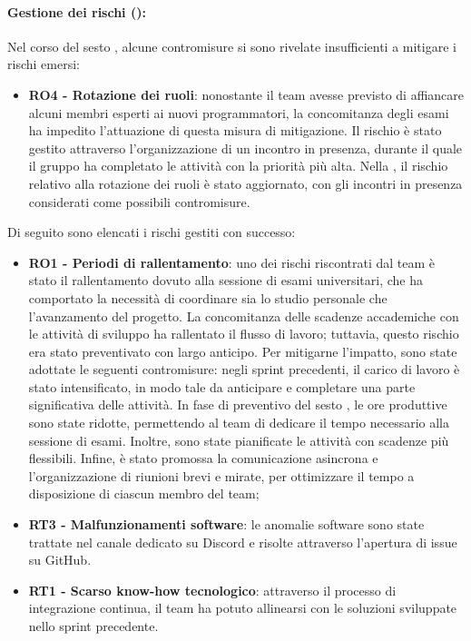 \paragraph*{Gestione dei rischi ():}
\par Nel corso del sesto , alcune contromisure si sono rivelate insufficienti a mitigare i rischi emersi:
\begin{itemize}
  \item \textbf{RO4 - Rotazione dei ruoli}: nonostante il team avesse previsto di affiancare alcuni membri esperti ai nuovi programmatori, la concomitanza degli esami ha impedito l'attuazione di questa misura di mitigazione. Il rischio è stato gestito attraverso l’organizzazione di un incontro in presenza, durante il quale il gruppo ha completato le attività con la priorità più alta. Nella , il rischio relativo alla rotazione dei ruoli è stato aggiornato, con gli incontri in presenza considerati come possibili contromisure.
\end{itemize}

\par Di seguito sono elencati i rischi gestiti con successo:
\begin{itemize}
  \item \textbf{RO1 - Periodi di rallentamento}: uno dei rischi riscontrati dal team è stato il rallentamento dovuto alla sessione di esami universitari, che ha comportato la necessità di coordinare sia lo studio personale che l'avanzamento del progetto. La concomitanza delle scadenze accademiche con le attività di sviluppo ha rallentato il flusso di lavoro; tuttavia, questo rischio era stato preventivato con largo anticipo. Per mitigarne l'impatto, sono state adottate le seguenti contromisure: negli sprint precedenti, il carico di lavoro è stato intensificato, in modo tale da anticipare e completare una parte significativa delle attività. In fase di preventivo del sesto , le ore produttive sono state ridotte, permettendo al team di dedicare il tempo necessario alla sessione di esami. Inoltre, sono state pianificate le attività con scadenze più flessibili. Infine, è stato promossa la comunicazione asincrona e l'organizzazione di riunioni brevi e mirate, per ottimizzare il tempo a disposizione di ciascun membro del team;
  \item \textbf{RT3 - Malfunzionamenti software}: le anomalie software sono state trattate nel canale dedicato su Discord e risolte attraverso l'apertura di issue su GitHub.
  \item \textbf{RT1 - Scarso know-how tecnologico}: attraverso il processo di integrazione continua, il team ha potuto allinearsi con le soluzioni sviluppate nello sprint precedente.
\end{itemize}
